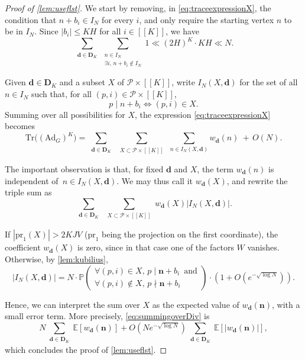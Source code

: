 \documentclass[11pt]{amsart}
\theoremstyle{definition}
\renewcommand{\leq}{\leqslant}
\newcommand{\sinterval}[1]{[\![#1]\!] }
\newcommand{\abs}[1]{\left|#1\right|}
\newcommand{\Ad}{\mathrm{Ad}}
\newcommand{\Tr}{\mathrm{Tr}}
\newcommand{\N}{I_N}
\newcommand{\primes}{\mathcal{P}}
\renewcommand{\d}{\boldsymbol{d}}
\newcommand{\n}{\mathbf{n}}
\newcommand{\curlyL}{V}
\newcommand{\graph}{G}
\newcommand{\sommespart}{b}
\newcommand{\fancyD}{\mathbf{D}}
\newcommand{\Dsf}{\fancyD_{\!\repK}}
\newcommand{\repR}{J}
\newcommand{\repK}{K}
\newcommand{\newK}{\sinterval{K}}
\newcommand{\Div}{X}
\begin{document}
\begin{proof}[Proof of \cref{lem:useflst}]
We start by removing, in \cref{eq:traceexpressionX}, the condition that $n+\sommespart_i\in \N$ for every $i$, and only require the starting vertex $n$ to be in $\N$. Since $|\sommespart_i| \leq \repK H$ for all $i\in \newK$, we have
\begin{equation*}
\sum_{\substack{\d\in \Dsf}}  \sum_{\substack{n\in \N\\ \exists i,\, n+\sommespart_i \not\in \N}} \!\!1 \ll (2H)^{\repK} \cdot  \repK H \ll N.
\end{equation*}

Given $\d\in \Dsf$ and a subset $\Div$ of $\primes\times \newK$, write $\N(\Div, \d)$ for the set of all $n\in \N$ such that, for all $(p, i)\in \primes\times \newK$,
\begin{equation*}
	p\mid n+\sommespart_i \iff (p,i)\in \Div.
\end{equation*}
Summing over all possibilities for $X$, the expression \cref{eq:traceexpressionX} becomes
\begin{equation*}
\Tr \big((\Ad_{\graph})^{\repK}\big) = \sum_{\substack{\d\in \Dsf}}\,  \sum_{\substack{\Div\subset \primes\times \newK}}\, \sum_{n\in \N(\Div, \d)}w_{\d}(n) \ + \, O(N).
\end{equation*}

The important observation is that, for fixed $\d$ and $\Div$, the term $w_{\d}(n)$ is independent of~$n\in \N(\Div, \d)$. We may thus call it $w_{\d}(\Div)$, and rewrite the triple sum as
\begin{equation}
\label{eq:summingoverDiv}
\sum_{\substack{\d\in \Dsf}}\, \sum_{\substack{\Div\subset \primes\times \newK}} w_{\d}(\Div) \abs{\N(\Div, \d)}.
\end{equation}

If $|\mathrm{pr}_1(\Div)| > 2\repK\repR \curlyL$ ($\mathrm{pr}_1$ being the projection on the first coordinate), the coefficient $w_{\d}(\Div)$ is zero, since in that case one of the factors $W$ vanishes. Otherwise, by \cref{lem:kubilius}, 
\begin{equation*}
\abs{\N(\Div, \d)} = N\cdot  \mathbb{P} \left(
	\begin{aligned}\forall (p, i)\in \Div, \, p\mid \n+\sommespart_i \, \text{ and}\\ \forall (p, i)\notin \Div, \, p\nmid \n+\sommespart_i \hspace{1pt} \ \ \ \ \ \ 
	\end{aligned}
\right) \cdot \left(1+O\left(e^{-\sqrt{\log N}}\right)\right).
\end{equation*}

Hence, we can interpret the sum over $\Div$ as the expected value of $w_{\d}(\n)$, with a small error term. More precisely, \cref{eq:summingoverDiv} is
\begin{equation*}
N \sum_{\substack{\d\in \Dsf}}\mathbb{E}\left[w_{\d}(\n)\right] + O\left(Ne^{-\sqrt{\log N}}\right) \sum_{\substack{\d\in \Dsf}} \mathbb{E}\left[ \abs{ w_{\d}(\n)   }\right],
\end{equation*}
which concludes the proof of \cref{lem:useflst}.
\end{proof}

\vspace{-1cm}


\end{document}
